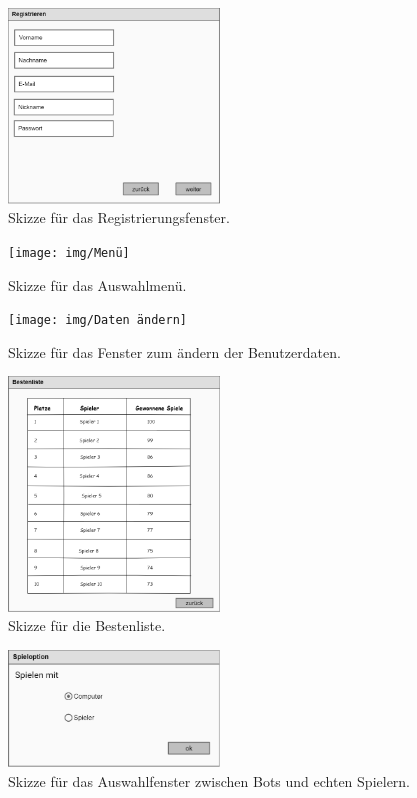 \begin{figure}
	\centering
	\includegraphics[width=0.5\textwidth]{img/Registrieren}
	\caption{Skizze für das Registrierungsfenster.}
	\label{gui:register}
\end{figure}

\begin{figure}
	\centering
	\texttt{[image: img/Menü]}
	\caption{Skizze für das Auswahlmenü.}
	\label{gui:menü}
\end{figure}

\begin{figure}
	\centering
	\texttt{[image: img/Daten ändern]}
	\caption{Skizze für das Fenster zum ändern der Benutzerdaten.}
	\label{gui:daten}
\end{figure}

\begin{figure}
	\centering
	\includegraphics[width=0.5\textwidth]{img/Bestenliste}
	\caption{Skizze für die Bestenliste.}
	\label{gui:bestenliste}
\end{figure}

\begin{figure}
	\centering
	\includegraphics[width=0.5\textwidth]{img/Spieloption}
	\caption{Skizze für das Auswahlfenster zwischen Bots und echten Spielern.}
	\label{gui:option}
\end{figure}

